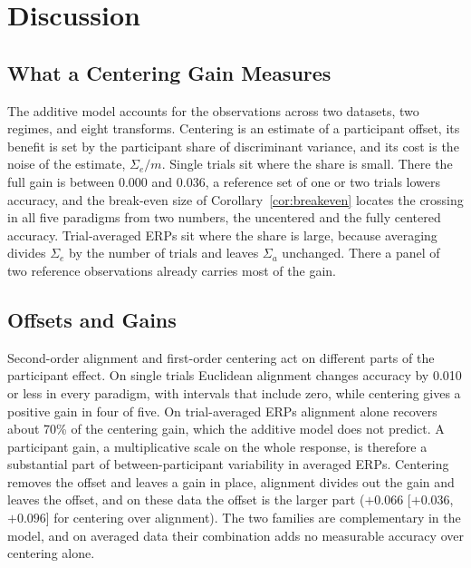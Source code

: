 \section{Discussion}
\subsection{What a Centering Gain Measures}
The additive model accounts for the observations across two datasets, two regimes, and eight transforms. Centering is an estimate of a participant offset, its benefit is set by the participant share of discriminant variance, and its cost is the noise of the estimate, $\Sigma_e/m$. Single trials sit where the share is small. There the full gain is between 0.000 and 0.036, a reference set of one or two trials lowers accuracy, and the break-even size of Corollary~\ref{cor:breakeven} locates the crossing in all five paradigms from two numbers, the uncentered and the fully centered accuracy. Trial-averaged ERPs sit where the share is large, because averaging divides $\Sigma_e$ by the number of trials and leaves $\Sigma_a$ unchanged. There a panel of two reference observations already carries most of the gain.

\subsection{Offsets and Gains}
Second-order alignment and first-order centering act on different parts of the participant effect. On single trials Euclidean alignment changes accuracy by 0.010 or less in every paradigm, with intervals that include zero, while centering gives a positive gain in four of five. On trial-averaged ERPs alignment alone recovers about 70\% of the centering gain, which the additive model does not predict. A participant gain, a multiplicative scale on the whole response, is therefore a substantial part of between-participant variability in averaged ERPs. Centering removes the offset and leaves a gain in place, alignment divides out the gain and leaves the offset, and on these data the offset is the larger part ($+0.066$ [$+0.036$, $+0.096$] for centering over alignment). The two families are complementary in the model, and on averaged data their combination adds no measurable accuracy over centering alone.

